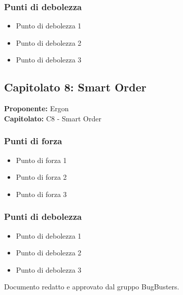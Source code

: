 \documentclass[a4paper,12pt]{article}
\begin{document}
\subsubsection{Punti di debolezza}
\begin{itemize}
\item Punto di debolezza 1
\item Punto di debolezza 2
\item Punto di debolezza 3
\end{itemize}

\subsection{Capitolato 8: Smart Order}

\begin{tcolorbox}[colback=lightgray!30,colframe=darkgray,arc=2mm,boxrule=0.3pt]
\textbf{Proponente:} Ergon \\
\textbf{Capitolato:} C8 - Smart Order
\end{tcolorbox}

\subsubsection{Punti di forza}
\begin{itemize}
\item Punto di forza 1
\item Punto di forza 2
\item Punto di forza 3
\end{itemize}

\subsubsection{Punti di debolezza}
\begin{itemize}
\item Punto di debolezza 1
\item Punto di debolezza 2
\item Punto di debolezza 3
\end{itemize}

\vfill
\begin{center}
    {\small\color{darkgray} Documento redatto e approvato dal gruppo BugBusters.}
\end{center}
\end{document}
